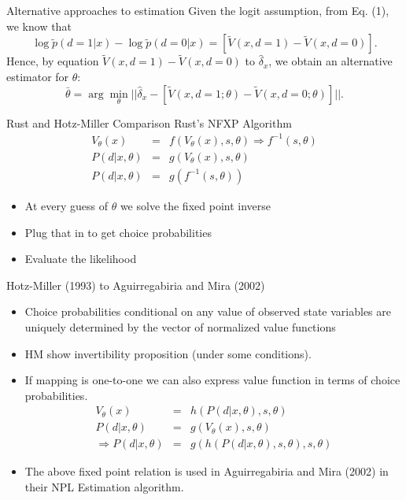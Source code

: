 \documentclass[aspectratio=169,11pt]{beamer}
\begin{document}
\begin{frame}{Alternative approaches to estimation}
Given the logit assumption, from Eq. (1), we know that
\begin{equation*}
\log \tilde p (d=1 |x) - \log \tilde p (d =0 |x) = \left [ \tilde V (x, d =1 ) - \tilde V (x, d = 0) \right ] .
\end{equation*}
Hence, by equation $\tilde V (x, d = 1) - \tilde V (x, d =0)$ to $\hat \delta_x$, we obtain an alternative estimator for $\theta$:
\begin{equation*}
\bar \theta = \arg \min_\theta || \hat \delta_x - \left [ \tilde V (x, d =1; \theta) - \tilde V (x, d = 0 ;\theta) \right ] ||.
\end{equation*}
\end{frame}

\begin{frame}{Rust and Hotz-Miller Comparison}
Rust's NFXP Algorithm
\begin{eqnarray*}
V_{\theta}(x) &=& f(V_{\theta}(x),s,\theta) \Rightarrow  f^{-1}(s,\theta)  \\
P(d | x,\theta) &=& g(V_{\theta}(x),s,\theta) \\
P(d | x,\theta) &=& g(f^{-1}(s,\theta)) 
\end{eqnarray*}
\begin{itemize}
\item At every guess of $\theta$ we solve the fixed point inverse
\item Plug that in to get choice probabilities
\item Evaluate the likelihood
\end{itemize}
\end{frame}


\begin{frame}{Hotz-Miller (1993) to Aguirregabiria and Mira (2002)}
\begin{itemize}
\item Choice probabilities conditional on any value of observed state variables are uniquely determined by the vector of normalized value functions
\item HM show invertibility proposition (under some conditions).
\item If mapping is one-to-one we can also express value function in terms of choice probabilities. 
\begin{eqnarray*}
V_{\theta}(x) &=& h(P(d | x,\theta),s,\theta)\\
P(d | x,\theta) &=& g(V_{\theta}(x),s,\theta) \\
\Rightarrow P(d | x,\theta) &=& g(h(P(d | x, \theta),s ,\theta),s,\theta)
\end{eqnarray*}
\item The above fixed point relation is used in Aguirregabiria and Mira (2002) in their NPL Estimation algorithm.
\end{itemize}
\end{frame}
\end{document}
